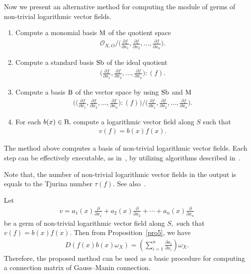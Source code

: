 \documentclass[pdftex]{sigma}%
\numberwithin{equation}{section}
\begin{document}
Now we present an alternative method for computing the module of germs of non-trivial logarithmic vector fields.
\begin{enumerate}\itemsep=0pt
\setlength{\leftskip}{0.45cm}
\item[{\it Step} 1:] Compute a monomial basis ${\rm M} $ of the quotient space
\begin{gather*}
{\mathcal O}_{X,O}\Big/\bigg(\frac{\partial f}{\partial x_1}, \frac{\partial f}{\partial x_2}, \dots, \frac{\partial f}{\partial x_n}\bigg).
\end{gather*}

\item[{\it Step} 2:] Compute a standard basis ${\rm Sb}$ of the ideal quotient
\begin{gather*}
\bigg(\frac{\partial f}{\partial x_1}, \frac{\partial f}{\partial x_2}, \dots, \frac{\partial f}{\partial x_n}\bigg) : (f).
\end{gather*}
\item[{\it Step} 3:] Compute a basis $ {\rm B} $ of the vector space by using $ {\rm Sb} $ and $ {\rm M} $
\begin{gather*}
\bigg(\bigg(\frac{\partial f}{\partial x_1}, \frac{\partial f}{\partial x_2}, \dots, \frac{\partial f}{\partial x_n}\bigg) : (f)\bigg)\Big/
\bigg(\frac{\partial f}{\partial x_1}, \frac{\partial f}{\partial x_2}, \dots, \frac{\partial f}{\partial x_n}\bigg).
\end{gather*}
\item[{\it Step} 4:] For each $ b(x) \in {\rm B}, $ compute a logarithmic vector field along $S$ such that
\begin{gather*}
v(f)=b(x)f(x).
\end{gather*}
\end{enumerate}

The method above computes a basis of non-trivial logarithmic vector fields.
Each step can be effectively executable, as in~\cite{TN20}, by utilizing algorithms described in~\cite{NT16a,NT16b,NT17a,TNN}.

Note that, the number of non-trivial logarithmic vector fields in the output is equals to the Tjurina number $ \tau(f)$. See also~\cite{M}.


 Let
\begin{gather*}
v=a_1(x)\frac{\partial}{\partial x_1} + a_2(x)\frac{\partial}{\partial x_2}+ \cdots +a_n(x)\frac{\partial}{\partial x_n}
\end{gather*}
be a germ of non-trivial logarithmic vector field along $S, $ such that $ v(f) = b(x)f(x)$. Then from Proposition~\ref{pro5},
we have
\begin{gather*}
D(f(x)b(x)\omega_X) = \left( \sum_{i=1}^{n} \frac{\partial a_i}{\partial x_i} \right) \omega_X.
\end{gather*}
Therefore, the proposed method can be used as a basic procedure for computing a connection matrix of Gauss--Manin connection.
\end{document}
